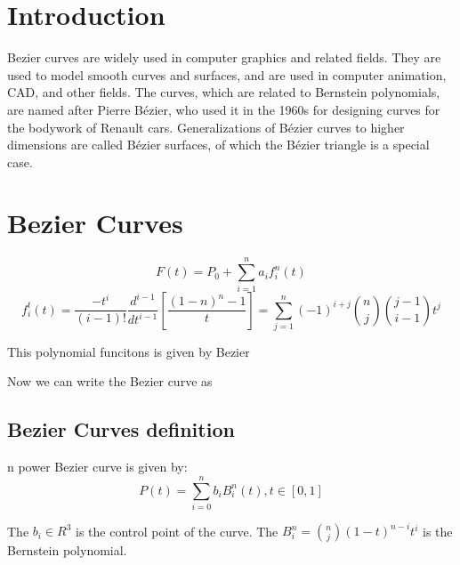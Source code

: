 \section{Introduction}
Bezier curves are widely used in computer graphics and related fields. They are used to model smooth curves and surfaces, and are used in computer animation, CAD, and other fields. The curves, which are related to Bernstein polynomials, are named after Pierre B\'ezier, who used it in the 1960s for designing curves for the bodywork of Renault cars. Generalizations of B\'ezier curves to higher dimensions are called B\'ezier surfaces, of which the B\'ezier triangle is a special case.

\section{Bezier Curves }

\begin{definition}

	\begin{equation*}
		F(t) = P_0 + \sum\limits_{i=1}^{n}a_if_i^{n}(t)
	\end{equation*}
	\begin{equation*}
		f_i^{t}(t) = \frac{-t^i}{(i-1)!}\frac{d^{i-1}}{dt^{i-1}} \left[\frac{(1-n)^{n}-1}{t}\right] = \sum\limits_{j=1}^{n}(-1)^{i+j}\binom{n}{j}\binom{j-1}{i-1}t^{j}
	\end{equation*}

	\label{def:bezier_curve}
\end{definition}

\begin{remark}
	This polynomial funcitons is given by Bezier
\end{remark}
Now we can write the Bezier curve as
\subsection{Bezier Curves definition}
\begin{definition}
	n power Bezier curve is given by:
	\begin{equation*}
		P(t) = \sum\limits_{i=0}^{n}b_iB_i^n(t),t\in[0,1]
	\end{equation*}
\end{definition}

\begin{remark}
	The $b_i\in R_{}^{3}$ is the control point of the curve. The $B_{i}^{n}=\binom{n}{j}(1-t)_{}^{n-i}t^i$ is the Bernstein polynomial.
\end{remark}

